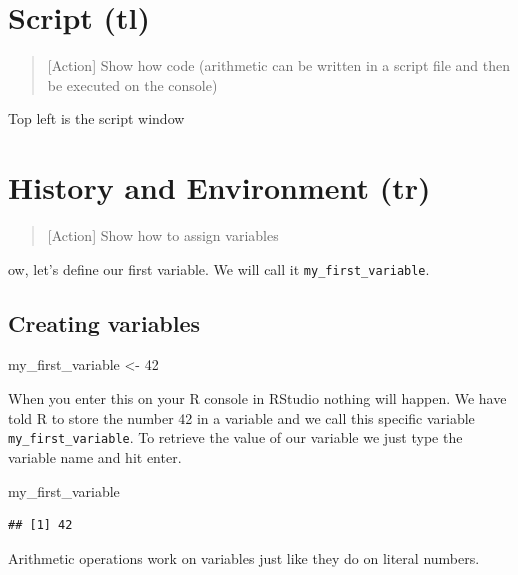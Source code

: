 \documentclass[]{book}
\newenvironment{Shaded}{\begin{snugshade}}{\end{snugshade}}
\newcommand{\DecValTok}[1]{\textcolor[rgb]{0.00,0.00,0.81}{#1}}
\newcommand{\StringTok}[1]{\textcolor[rgb]{0.31,0.60,0.02}{#1}}
\newcommand{\NormalTok}[1]{#1}
\theoremstyle{definition}
\theoremstyle{definition}
\theoremstyle{definition}
\theoremstyle{remark}
\begin{document}
\section{Script (tl)}\label{script-tl}

\begin{quote}
{[}Action{]} Show how code (arithmetic can be written in a script file
and then be executed on the console)
\end{quote}

Top left is the script window

\section{History and Environment (tr)}\label{history-and-environment-tr}

\begin{quote}
{[}Action{]} Show how to assign variables
\end{quote}

ow, let's define our first variable. We will call it
\texttt{my\_first\_variable}.

\subsection{Creating variables}\label{creating-variables}

\begin{Shaded}
\begin{Highlighting}[]
\NormalTok{my_first_variable <-}\StringTok{ }\DecValTok{42}
\end{Highlighting}
\end{Shaded}

When you enter this on your R console in RStudio nothing will happen. We
have told R to store the number 42 in a variable and we call this
specific variable \texttt{my\_first\_variable}. To retrieve the value of
our variable we just type the variable name and hit enter.

\begin{Shaded}
\begin{Highlighting}[]
\NormalTok{my_first_variable}
\end{Highlighting}
\end{Shaded}

\begin{verbatim}
## [1] 42
\end{verbatim}

Arithmetic operations work on variables just like they do on literal
numbers.
\end{document}
